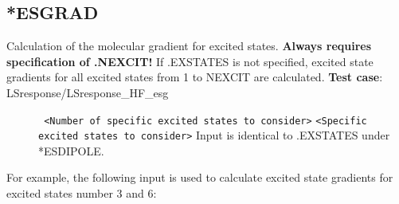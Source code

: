 \subsection{*ESGRAD}\label{subsec:esg}
Calculation of the molecular gradient for excited states.
{\bf Always requires specification of .NEXCIT!}
If .EXSTATES is not specified, excited state gradients
for all excited states from 1 to NEXCIT
are calculated. \newline
{\bf Test case}: LSresponse/LSresponse\_HF\_esg 
\begin{description}
\item[] \verb| | \newline
\verb|<Number of specific excited states to consider>|\newline
\verb|<Specific excited states to consider>|\newline
Input is identical to .EXSTATES under *ESDIPOLE.
\end{description}
For example, the following input is used 
to calculate excited state gradients for excited states number 3 and 6:
\begin{description}
\item[]
\item[]
\item[]
\item[]
\item[]
\item[]
\item[]
\end{description}


